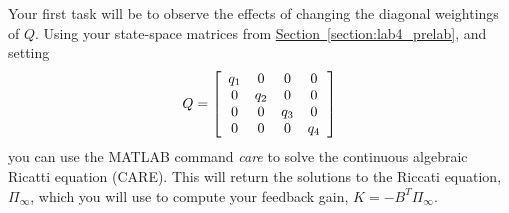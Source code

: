 Your first task will be to observe the effects of changing the diagonal weightings of $Q$. Using your state-space matrices from \hyperref[section:lab4_prelab]{Section~\ref{section:lab4_prelab}}, and setting
\[
    Q = \left[\begin{array}{c c c c}
            q_1 & 0   & 0   & 0   \\
            0   & q_2 & 0   & 0   \\
            0   & 0   & q_3 & 0   \\
            0   & 0   & 0   & q_4
        \end{array}\right]
\]
you can use the MATLAB command \emph{care} to solve the continuous algebraic Ricatti equation (CARE). This will return the solutions to the Riccati equation, $\Pi_{\infty}$, which you will use to compute your feedback gain, $K=-B^T \Pi_{\infty}$.
